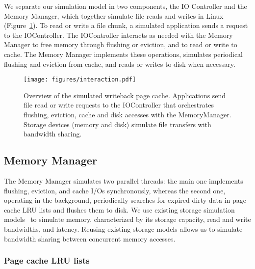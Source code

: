 \documentclass[conference]{IEEEtran}
\begin{document}
    We separate our simulation model in two components, the IO
    Controller and the Memory Manager, which together simulate 
    file reads and writes in Linux (Figure~\ref{fig:interaction}). 
    To read or write a file chunk, a simulated application sends a
    request to the IOController. The IOController interacts as needed with
    the Memory Manager to free memory through flushing or eviction,
    and to read or write to cache. The Memory Manager
    implements these operations, simulates periodical flushing
    and eviction from cache, and reads or writes to disk when necessary.
    \begin{figure}
           \centering
           \texttt{[image: figures/interaction.pdf]}
           \caption{Overview of the simulated writeback page cache.
           Applications send file read or write requests to the
           IOController that orchestrates flushing, eviction, cache
           and disk accesses with the MemoryManager. Storage
           devices (memory and disk) simulate file transfers with
           bandwidth sharing.}
           \label{fig:interaction}
    \end{figure}

    \subsection{Memory Manager}

    The Memory Manager simulates two parallel threads: the main one
    implements flushing, eviction, and cache I/Os synchronously, whereas
    the second one, operating in the background, periodically searches for
    expired dirty data in page cache LRU lists and flushes them to disk. We
    use existing storage simulation models~\cite{lebre2015} to simulate
    memory, characterized by its storage capacity, read and write
    bandwidths, and latency. Reusing existing storage models allows us to
    simulate bandwidth sharing between concurrent memory accesses.

    \subsubsection{Page cache LRU lists}
\end{document}
